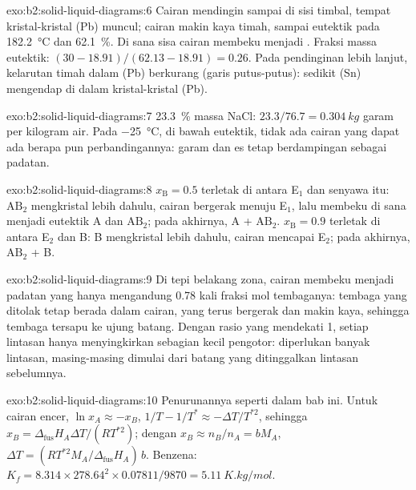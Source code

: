 \begin{solution}{exo:b2:solid-liquid-diagrams:6}
Cairan mendingin sampai  di sisi timbal, tempat kristal-kristal
(Pb) muncul; cairan makin kaya timah, sampai eutektik pada
\qty{182.2}{\degreeCelsius} dan 62.1~\%. Di sana sisa cairan membeku
menjadi . Fraksi massa eutektik:
$(30 - 18.91)/(62.13 - 18.91) = 0.26$. Pada pendinginan lebih lanjut,
kelarutan timah dalam (Pb) berkurang (garis putus-putus): sedikit (Sn)
mengendap di dalam kristal-kristal (Pb).
\end{solution}

\begin{solution}{exo:b2:solid-liquid-diagrams:7}
23.3~\% massa NaCl: $23.3/76.7 = \qty{0.304}{kg}$ garam per kilogram air.
Pada \qty{-25}{\degreeCelsius}, di bawah eutektik, tidak ada cairan yang
dapat ada berapa pun perbandingannya: garam dan es tetap berdampingan
sebagai padatan.
\end{solution}

\begin{solution}{exo:b2:solid-liquid-diagrams:8}
$x_{\mathrm B} = 0.5$ terletak di antara E$_1$ dan senyawa itu: $\mathrm{AB_2}$
mengkristal lebih dahulu, cairan bergerak menuju E$_1$, lalu membeku di
sana menjadi eutektik A dan $\mathrm{AB_2}$; pada akhirnya, A +
$\mathrm{AB_2}$. $x_{\mathrm B} = 0.9$ terletak di antara E$_2$ dan B: B
mengkristal lebih dahulu, cairan mencapai E$_2$; pada akhirnya,
$\mathrm{AB_2}$ + B.
\end{solution}

\begin{solution}{exo:b2:solid-liquid-diagrams:9}
Di tepi belakang zona, cairan membeku menjadi padatan yang hanya
mengandung 0.78 kali fraksi mol tembaganya: tembaga yang ditolak tetap
berada dalam cairan, yang terus bergerak dan makin kaya, sehingga tembaga
tersapu ke ujung batang. Dengan rasio yang mendekati 1, setiap lintasan
hanya menyingkirkan sebagian kecil pengotor: diperlukan banyak lintasan,
masing-masing dimulai dari batang yang ditinggalkan lintasan sebelumnya.
\end{solution}

\begin{solution}{exo:b2:solid-liquid-diagrams:10}
Penurunannya seperti dalam bab ini. Untuk cairan encer, $\ln x_A \approx -x_B$,
$1/T -
1/T^* \approx -\Delta T/T^{*2}$, sehingga
$x_B = \Delta_{\text{fus}}H_A\Delta T/(RT^{*2})$; dengan
$x_B \approx n_B/n_A = bM_A$, $\Delta T = (RT^{*2}M_A/\Delta_{\text{fus}}H_A)\,b$.
Benzena: $K_f = 8.314 \times 278.64^2 \times 0.07811/9870 = \qty{5.11}{K.kg/mol}$.
\end{solution}

